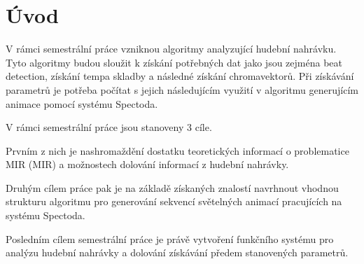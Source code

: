 \chapter*{Úvod}
{}

V rámci semestrální práce vzniknou algoritmy analyzující hudební nahrávku.
Tyto algoritmy budou sloužit k získání potřebných dat jako jsou zejména beat detection,
získání tempa skladby a následné získání chromavektorů.
Při získávání parametrů je potřeba počítat s jejich následujícím využití v algoritmu generujícím animace pomocí systému Spectoda. 
\bigskip

V rámci semestrální práce jsou stanoveny 3 cíle.

Prvním z nich je nashromaždění dostatku teoretických informací o problematice \acs{MIR} (\acl{MIR})
a možnostech dolování informací z hudební nahrávky.

Druhým cílem práce pak je na základě získaných znalostí navrhnout vhodnou strukturu algoritmu pro generování sekvencí světelných animací pracujících na systému Spectoda.

Posledním cílem semestrální práce je právě vytvoření funkčního systému pro analýzu hudební nahrávky a dolování získávání předem stanovených parametrů.
